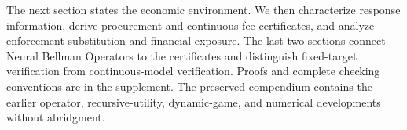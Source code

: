 The next section states the economic environment. We then characterize response information, derive procurement and continuous-fee certificates, and analyze enforcement substitution and financial exposure. The last two sections connect Neural Bellman Operators to the certificates and distinguish fixed-target verification from continuous-model verification. Proofs and complete checking conventions are in the supplement. The preserved compendium contains the earlier operator, recursive-utility, dynamic-game, and numerical developments without abridgment.
